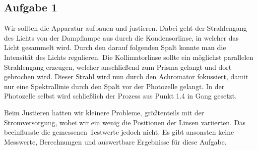\subsection{Aufgabe 1}

Wir sollten die Apparatur aufbauen und justieren. Dabei geht der Strahlengang  des Lichts von der Dampflampe aus durch die Kondensorlinse, in welcher das Licht gesammelt wird. Durch den darauf folgenden Spalt konnte man die Intensität des Lichts regulieren. Die Kollimatorlinse sollte ein möglichst parallelen Strahlengang erzeugen, welcher anschließend zum Prisma gelangt und dort gebrochen wird. Dieser Strahl wird nun durch den Achromator fokussiert, damit nur eine Spektrallinie durch den Spalt vor der Photozelle gelangt. In der Photozelle selbst wird schließlich der Prozess aus Punkt 1.4 in Gang gesetzt.
\\
\begin{center}
\begin{minipage}{\linewidth}
\centering
{}
%
\label{ringe}
\end{minipage}
\end{center}

Beim Justieren hatten wir kleinere Probleme, größtenteils mit der Stromversorgung, wobei wir ein wenig die Positionen der Linsen variierten. Das beeinflusste die gemessenen Testwerte jedoch nicht. Es gibt ansonsten keine Messwerte, Berechnungen und auswertbare Ergebnisse für diese Aufgabe.
\newpage